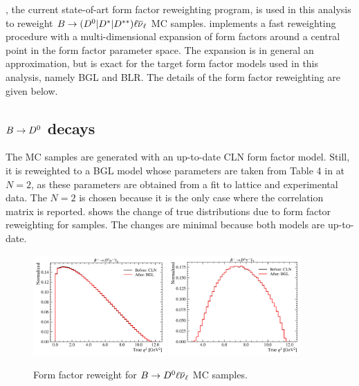 \Hammer, the current state-of-art form factor reweighting program, is used
in this analysis to reweight
$B \rightarrow ({{D}^0}| {{D}^*}| D^{**}) {\ell}{{\overline{\nu}}_\ell}$ MC samples.
\Hammer implements a fast reweighting procedure with a multi-dimensional
expansion of form factors around a central point in the form factor parameter
space.
The expansion is in general an approximation, but is exact for the target form
factor models used in this analysis, namely BGL and BLR.
The details of the form factor reweighting are given below.

\subsection{$B \rightarrow {\ensuremath{{D}^0}}$ decays}
The \Dz MC samples are generated with an up-to-date CLN form factor model.
Still, it is reweighted to a BGL model whose parameters are taken
from Table 4 in \cite{Bigi_2016} at $N = 2$, as these
parameters are obtained from a fit to lattice and experimental data.
The $N = 2$ is chosen because it is the only case where the correlation matrix
is reported.
 shows the change of true \qSq distributions due to form factor
reweighting for \Dz samples.
The changes are minimal because both models are up-to-date.

\begin{figure}[htb]
    \centering
    \includegraphics[width=0.45\textwidth]{
        ./figs-mc-correction/reweighting-form-factors/norm/D0Mu.pdf
    }
    \includegraphics[width=0.45\textwidth]{
        ./figs-mc-correction/reweighting-form-factors/sig/D0Tau.pdf
    }
    \caption{
        Form factor reweight for $B \rightarrow {\ensuremath{{D}^0}} {\ensuremath{\ell}}{\ensuremath{{\overline{\nu}}_\ell}}$ MC samples.
    }
    \label{fig:ff-d0}
\end{figure}



